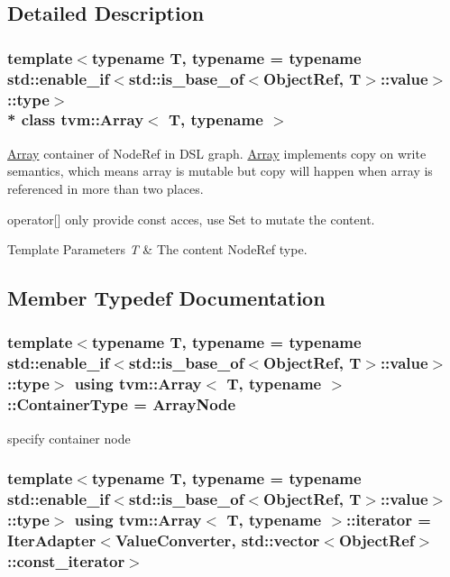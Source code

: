 \subsection{Detailed Description}
\subsubsection*{template$<$typename T, typename = typename std\+::enable\+\_\+if$<$std\+::is\+\_\+base\+\_\+of$<$\+Object\+Ref, T$>$\+::value$>$\+::type$>$\\*
class tvm\+::\+Array$<$ T, typename $>$}

\hyperlink{classtvm_1_1Array}{Array} container of Node\+Ref in D\+SL graph. \hyperlink{classtvm_1_1Array}{Array} implements copy on write semantics, which means array is mutable but copy will happen when array is referenced in more than two places. 

operator\mbox{[}\mbox{]} only provide const acces, use Set to mutate the content. 
\begin{DoxyTemplParams}{Template Parameters}
{\em T} & The content Node\+Ref type. \\
\hline
\end{DoxyTemplParams}


\subsection{Member Typedef Documentation}
\subsubsection[{\texorpdfstring{Container\+Type}{ContainerType}}]{\setlength{\rightskip}{0pt plus 5cm}template$<$typename T, typename  = typename std\+::enable\+\_\+if$<$std\+::is\+\_\+base\+\_\+of$<$\+Object\+Ref, T$>$\+::value$>$\+::type$>$ using {\bf tvm\+::\+Array}$<$ T, typename $>$\+::{\bf Container\+Type} =  {\bf Array\+Node}}\hypertarget{classtvm_1_1Array_ab85f7f463f8a418f6b4dcffdf43b007c}{}\label{classtvm_1_1Array_ab85f7f463f8a418f6b4dcffdf43b007c}


specify container node 

\subsubsection[{\texorpdfstring{iterator}{iterator}}]{\setlength{\rightskip}{0pt plus 5cm}template$<$typename T, typename  = typename std\+::enable\+\_\+if$<$std\+::is\+\_\+base\+\_\+of$<$\+Object\+Ref, T$>$\+::value$>$\+::type$>$ using {\bf tvm\+::\+Array}$<$ T, typename $>$\+::{\bf iterator} =  {\bf Iter\+Adapter}$<${\bf Value\+Converter}, std\+::vector$<$Object\+Ref$>$\+::const\+\_\+iterator$>$}\hypertarget{classtvm_1_1Array_a82550eb5257293ba5af8866aa8ff16e6}{}\label{classtvm_1_1Array_a82550eb5257293ba5af8866aa8ff16e6}
